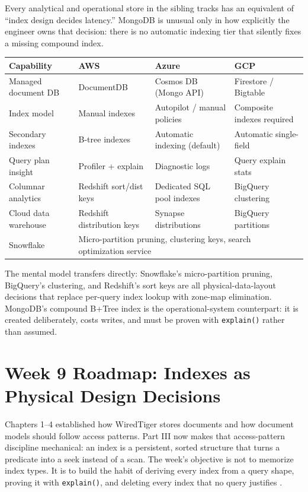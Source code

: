 \begin{crosscloud}
Every analytical and operational store in the sibling tracks has an equivalent of ``index design decides latency.'' MongoDB is unusual only in how explicitly the engineer owns that decision: there is no automatic indexing tier that silently fixes a missing compound index.

\vspace{2mm}
{\footnotesize
\begin{tabular}{@{}p{2.9cm}p{3.0cm}p{3.0cm}p{3.0cm}@{}} 
\toprule
\textbf{Capability} & \textbf{AWS} & \textbf{Azure} & \textbf{GCP} \\
\midrule
Managed document DB & DocumentDB & Cosmos DB (Mongo API) & Firestore / Bigtable \\
Index model & Manual indexes & Autopilot / manual policies & Composite indexes required \\
Secondary indexes & B-tree indexes & Automatic indexing (default) & Automatic single-field \\
Query plan insight & Profiler + explain & Diagnostic logs & Query explain stats \\
Columnar analytics & Redshift sort/dist keys & Dedicated SQL pool indexes & BigQuery clustering \\
Cloud data warehouse & Redshift distribution keys & Synapse distributions & BigQuery partitions \\
\addlinespace
Snowflake & \multicolumn{3}{l}{Micro-partition pruning, clustering keys, search optimization service} \\
\bottomrule
\end{tabular}}

\vspace{1mm}
The mental model transfers directly: Snowflake's micro-partition pruning, BigQuery's clustering, and Redshift's sort keys are all physical-data-layout decisions that replace per-query index lookup with zone-map elimination. MongoDB's compound B+Tree index is the operational-system counterpart: it is created deliberately, costs writes, and must be proven with \texttt{explain()} rather than assumed.
\end{crosscloud}

\section{Week 9 Roadmap: Indexes as Physical Design Decisions}
Chapters 1--4 established how WiredTiger stores documents and how document models should follow access patterns. Part III now makes that access-pattern discipline mechanical: an index is a persistent, sorted structure that turns a predicate into a seek instead of a scan. The week's objective is not to memorize index types. It is to build the habit of deriving every index from a query shape, proving it with \texttt{explain()}, and deleting every index that no query justifies \cite{mongodbIndexesDocs,mongodbExplainDocs}.

